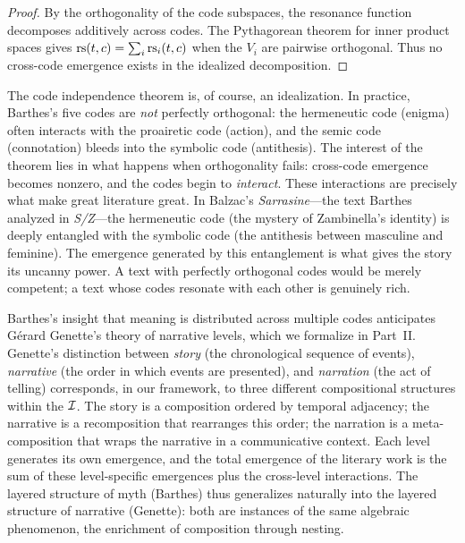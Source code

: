 \begin{proof}
By the orthogonality of the code subspaces, the resonance function decomposes additively across codes. The Pythagorean theorem for inner product spaces gives $\mathrm{rs}(t, c) = \sum_i \mathrm{rs}_i(t, c)$ when the $V_i$ are pairwise orthogonal. Thus no cross-code emergence exists in the idealized decomposition.
\end{proof}

\begin{interpretation}
The code independence theorem is, of course, an idealization. In practice, Barthes's five codes are \emph{not} perfectly orthogonal: the hermeneutic code (enigma) often interacts with the proairetic code (action), and the semic code (connotation) bleeds into the symbolic code (antithesis). The interest of the theorem lies in what happens when orthogonality fails: cross-code emergence becomes nonzero, and the codes begin to \emph{interact}. These interactions are precisely what make great literature great. In Balzac's \textit{Sarrasine}---the text Barthes analyzed in \textit{S/Z}---the hermeneutic code (the mystery of Zambinella's identity) is deeply entangled with the symbolic code (the antithesis between masculine and feminine). The emergence generated by this entanglement is what gives the story its uncanny power. A text with perfectly orthogonal codes would be merely competent; a text whose codes resonate with each other is genuinely rich.
\end{interpretation}

\begin{remark}
Barthes's insight that meaning is distributed across multiple codes anticipates G\'erard Genette's theory of narrative levels, which we formalize in Part~II. Genette's distinction between \emph{story} (the chronological sequence of events), \emph{narrative} (the order in which events are presented), and \emph{narration} (the act of telling) corresponds, in our framework, to three different compositional structures within the $\mathcal{I}$. The story is a composition ordered by temporal adjacency; the narrative is a recomposition that rearranges this order; the narration is a meta-composition that wraps the narrative in a communicative context. Each level generates its own emergence, and the total emergence of the literary work is the sum of these level-specific emergences plus the cross-level interactions. The layered structure of myth (Barthes) thus generalizes naturally into the layered structure of narrative (Genette): both are instances of the same algebraic phenomenon, the enrichment of composition through nesting.
\end{remark}

